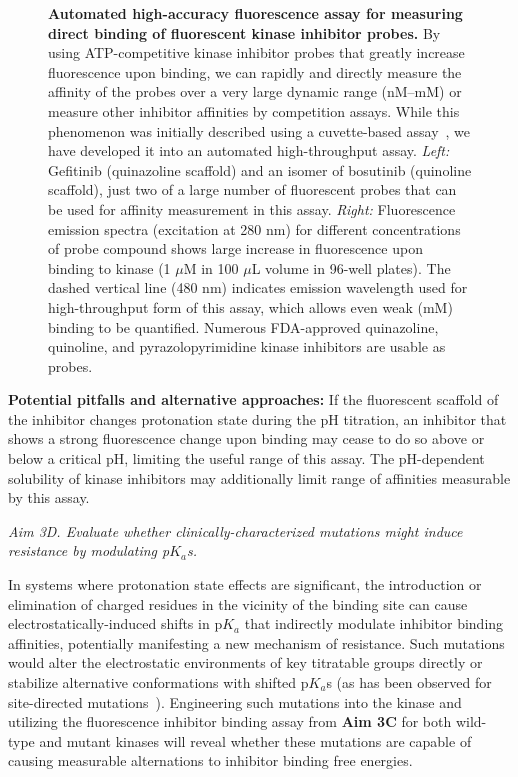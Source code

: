 \documentclass[11pt]{article}
\begin{document}
{\begin{figure}[t]
\begin{centering}
\end{centering}
\vspace{-0.3in}
\caption{\footnotesize{\bf Automated high-accuracy fluorescence assay for measuring direct binding of fluorescent kinase inhibitor probes.}
By using ATP-competitive kinase inhibitor probes that greatly increase fluorescence upon binding, we can rapidly and directly measure the affinity of the probes over a very large dynamic range (nM--mM) or measure other inhibitor affinities by competition assays.
While this phenomenon was initially described using a cuvette-based assay~\cite{levinson-boxer:plos-one:2012:bosutinib}, we have developed it into an automated high-throughput assay.
\emph{Left:} Gefitinib (quinazoline scaffold) and an isomer of bosutinib (quinoline scaffold), just two of a large number of fluorescent probes that can be used for affinity measurement in this assay.
\emph{Right:} Fluorescence emission spectra (excitation at 280 nm) for different concentrations of probe compound shows large increase in fluorescence upon binding to kinase (1 $\mu$M in 100 $\mu$L volume in 96-well plates).
The dashed vertical line (480 nm) indicates emission wavelength used for high-throughput form of this assay, which allows even weak (mM) binding to be quantified.
Numerous FDA-approved quinazoline, quinoline, and pyrazolopyrimidine kinase inhibitors are usable as probes.
\vspace{-0.2in}
\label{figure:fluorescence-assay}}
\end{figure}

{\bf Potential pitfalls and alternative approaches:} 
If the fluorescent scaffold of the inhibitor changes protonation state during the pH titration, an inhibitor that shows a strong fluorescence change upon binding may cease to do so above or below a critical pH, limiting the useful range of this assay.
The pH-dependent solubility of kinase inhibitors may additionally limit range of affinities measurable by this assay.

{\emph{Aim 3D. Evaluate whether clinically-characterized mutations might induce resistance by modulating p$K_a$s.}

In systems where protonation state effects are significant, the introduction or elimination of charged residues in the vicinity of the binding site can cause electrostatically-induced shifts in p$K_a$ that indirectly modulate inhibitor binding affinities, potentially manifesting a new mechanism of resistance.
Such mutations would  alter the electrostatic environments of key titratable groups directly or stabilize alternative conformations with shifted p$K_a$s (as has been observed for site-directed mutations~\cite{kuriyan-shaw:pnas:2009:abl-protonation-state}).
Engineering such mutations into the kinase and utilizing the fluorescence inhibitor binding assay from {\bf Aim 3C} for both wild-type and mutant kinases will reveal whether these mutations are capable of causing measurable alternations to inhibitor binding free energies.

}}
\end{document}
